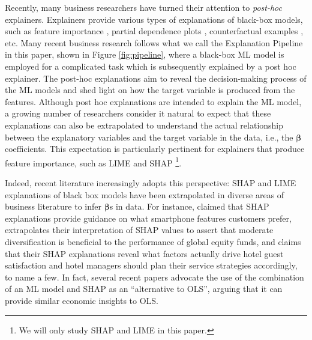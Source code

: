 \documentclass[mnsc,blindrev]{informs3}
\begin{document}
Recently, many business researchers have turned their attention to \emph{post-hoc} explainers.  Explainers provide various types of explanations of black-box models, such as feature importance \citep{ribeiro16lime,lundberg17shap}, partial dependence plots \citep{friedman01pdp}, counterfactual examples \citep{mothilal20dice}, etc.  Many recent business research follows what we call the Explanation Pipeline in this paper, shown in Figure \ref{fig:pipeline}, where a black-box ML model is employed for a complicated task which is subsequently explained by a post hoc explainer. %
The post-hoc explanations aim to reveal the decision-making process of the ML models and shed light on how the target variable is produced from the features. 
Although post hoc explanations are intended to explain the ML model, a growing number of researchers consider it natural to expect that these explanations can also be extrapolated to understand the actual relationship between the explanatory variables and the target variable in the data, i.e., the $\boldsymbol{\beta}$ coefficients. This expectation is particularly pertinent for explainers that produce feature importance, such as LIME \citep{ribeiro16lime} and SHAP \citep{lundberg17shap}\footnote{We will only study SHAP and LIME in this paper.}.


Indeed, recent literature increasingly adopts this perspective: SHAP and LIME explanations of black box models have been extrapolated in diverse areas of business literature to infer $\boldsymbol{\beta}$s in data. For instance, \cite{park2024extracting} claimed that SHAP explanations provide guidance on what smartphone features customers prefer, \cite{kovvuri23fund}  extrapolates their interpretation of SHAP values to assert that moderate diversification is beneficial to the performance of global equity funds, and \cite{sanchez2023role} claims that their SHAP explanations reveal what factors actually drive hotel guest satisfaction and hotel managers should plan their service strategies accordingly, to name a few. In fact, several recent papers \citep{berger2023supply,srivastava23energy,zhou23consumption,hanauer22boosting} advocate the use of the combination of an ML model and SHAP as an  ``alternative to OLS'', arguing that it can provide similar economic insights to OLS. %
\end{document}
